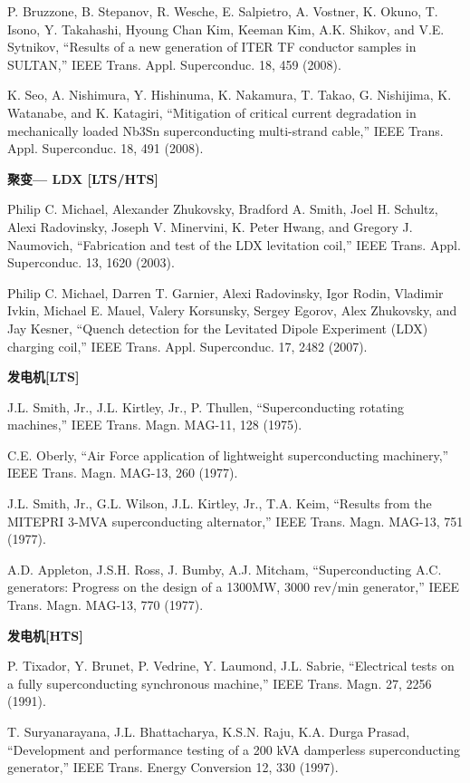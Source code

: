 \noindent [9.55] P. Bruzzone, B. Stepanov, R. Wesche, E. Salpietro, A. Vostner, K. Okuno, T. Isono,
Y. Takahashi, Hyoung Chan Kim, Keeman Kim, A.K. Shikov, and V.E. Sytnikov,
``Results of a new generation of ITER TF conductor samples in SULTAN,”
IEEE Trans. Appl. Superconduc. 18, 459 (2008).

\noindent [9.56] K. Seo, A. Nishimura, Y. Hishinuma, K. Nakamura, T. Takao, G. Nishijima, K.
Watanabe, and K. Katagiri, ``Mitigation of critical current degradation in mechanically
loaded Nb3Sn superconducting multi-strand cable,” IEEE Trans. Appl.
Superconduc. 18, 491 (2008).

\noindent \textbf{聚变--- LDX [LTS/HTS] }

\noindent [9.57] Philip C. Michael, Alexander Zhukovsky, Bradford A. Smith, Joel H. Schultz, Alexi
Radovinsky, Joseph V. Minervini, K. Peter Hwang, and Gregory J. Naumovich,
``Fabrication and test of the LDX levitation coil,” IEEE Trans. Appl. Superconduc.
13, 1620 (2003).

\noindent [9.58] Philip C. Michael, Darren T. Garnier, Alexi Radovinsky, Igor Rodin, Vladimir
Ivkin, Michael E. Mauel, Valery Korsunsky, Sergey Egorov, Alex Zhukovsky, and
Jay Kesner, ``Quench detection for the Levitated Dipole Experiment (LDX) charging
coil,” IEEE Trans. Appl. Superconduc. 17, 2482 (2007).

\noindent \textbf{发电机[LTS] }

\noindent [9.59] J.L. Smith, Jr., J.L. Kirtley, Jr., P. Thullen, ``Superconducting rotating machines,”
IEEE Trans. Magn. MAG-11, 128 (1975).

\noindent [9.60] C.E. Oberly, ``Air Force application of lightweight superconducting machinery,”
IEEE Trans. Magn. MAG-13, 260 (1977).

\noindent [9.61] J.L. Smith, Jr., G.L. Wilson, J.L. Kirtley, Jr., T.A. Keim, ``Results from the MITEPRI
3-MVA superconducting alternator,” IEEE Trans. Magn. MAG-13, 751
(1977).

\noindent [9.62] A.D. Appleton, J.S.H. Ross, J. Bumby, A.J. Mitcham, ``Superconducting A.C.
generators: Progress on the design of a 1300MW, 3000 rev/min generator,” IEEE
Trans. Magn. MAG-13, 770 (1977).

\noindent \textbf{发电机[HTS] }

\noindent [9.63] P. Tixador, Y. Brunet, P. Vedrine, Y. Laumond, J.L. Sabrie, ``Electrical tests on a
fully superconducting synchronous machine,” IEEE Trans. Magn. 27, 2256 (1991).

\noindent [9.64] T. Suryanarayana, J.L. Bhattacharya, K.S.N. Raju, K.A. Durga Prasad, ``Development
and performance testing of a 200 kVA damperless superconducting generator,”
IEEE Trans. Energy Conversion 12, 330 (1997).

